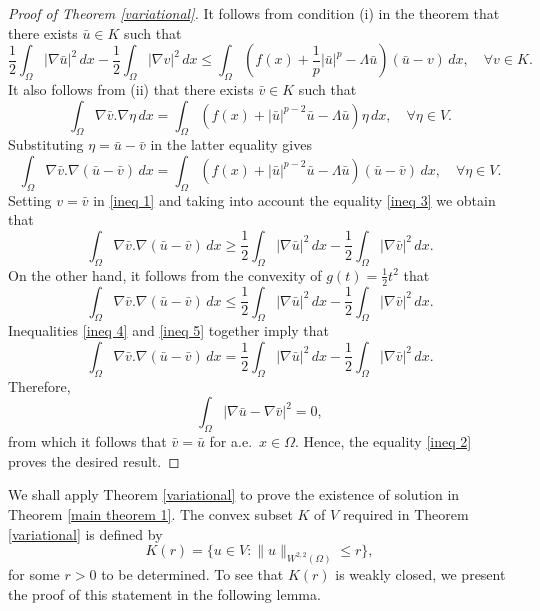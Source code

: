 \documentclass[reqno]{amsart}
\begin{document}
\begin{proof}[Proof of Theorem \ref{variational}]
It follows from condition (i) in the theorem that there exists \(\bar{u} \in K\)
such that
\begin{equation}\label{ineq 1}
    \frac{1}{2}\int_{\Omega} |\nabla \bar{u}|^2\,dx
    -\frac{1}{2}\int_{\Omega} |\nabla v|^2\,dx
    \leq \int_\Omega (   f(x)+\frac{1}{p}|\bar{u}|^{p}- \Lambda \bar{u}) (\bar{u}-v)\,dx ,
    \quad \forall v\in  K.
\end{equation}
It also follows from (ii) that there exists \(\bar{v} \in K\) such that
\begin{equation}\label{ineq 2}
\int_\Omega\nabla\bar{v}.\nabla\eta\,dx=\int_\Omega (f(x)
+|\bar{u}|^{p-2}\bar{u} - \Lambda \bar{u})\eta\,dx,\quad \forall\eta\in V.
\end{equation}
Substituting \(\eta = \bar{u} - \bar{v}\) in the latter equality gives
\begin{equation}\label{ineq 3}
\int_\Omega\nabla\bar{v}.\nabla(\bar{u} - \bar{v})\,dx
=\int_\Omega (f(x)  +|\bar{u}|^{p-2}\bar{u} - \Lambda \bar{u})(\bar{u}
- \bar{v})\,dx,\quad \forall\eta\in V.
\end{equation}
Setting \(v = \bar{v}\) in \eqref{ineq 1} and taking into account the equality
\eqref{ineq 3} we obtain that
\begin{equation}\label{ineq 4}
 \int_\Omega\nabla\bar{v}.\nabla(\bar{u} - \bar{v})\,dx
 \geq\frac{1}{2}\int_{\Omega} |\nabla \bar{u}|^2\,dx
 -\frac{1}{2}\int_{\Omega} |\nabla \bar{v}|^2\,dx.
\end{equation}
On the other hand, it follows from the convexity of \( g(t)=\frac{1}{2}t^2\) that
\begin{equation}\label{ineq 5}
    \int_\Omega\nabla\bar{v}.\nabla(\bar{u} - \bar{v})\,dx \leq\frac{1}{2}\int_{\Omega} |\nabla \bar{u}|^2\,dx -\frac{1}{2}\int_{\Omega} |\nabla \bar{v}|^2\,dx.
\end{equation}
Inequalities \eqref{ineq 4} and \eqref{ineq 5} together imply that
\[
\int_\Omega\nabla\bar{v}.\nabla(\bar{u} - \bar{v})\,dx
=\frac{1}{2}\int_{\Omega} |\nabla \bar{u}|^2\,dx-\frac{1}{2}\int_{\Omega}
|\nabla \bar{v}|^2\,dx.
\]
Therefore,
\[
\int_{\Omega} |\nabla \bar{u}-\nabla \bar{v}|^2=0,
\]
from which it follows that \(\bar{v}=\bar{u}\) for a.e.\
 \(x \in\Omega\). Hence, the equality \eqref{ineq 2} proves the desired  result.
\end{proof}

We shall apply Theorem \ref{variational} to prove the existence of solution  in
Theorem \ref{main theorem 1}.  The convex subset \(K\) of \(V\)
required in Theorem \ref{variational} is defined by
\begin{equation}\label{def K}
K(r)=\{u\in V: \rVert u \rVert_{ W^{2,2}(\Omega)}\leq r\},
\end{equation}
for some \(r > 0\) to be determined. To see that \(K(r)\) is weakly closed,
we present the proof of this statement in the following lemma.
\end{document}
